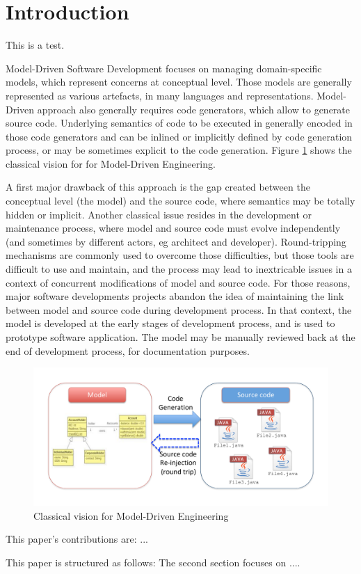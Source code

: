 \section{Introduction}

This is a test.

Model-Driven Software Development focuses on managing domain-specific models, which represent concerns at conceptual level. Those models are generally represented as various artefacts, in many languages and representations. Model-Driven approach also generally requires code generators, which allow to generate source code. Underlying semantics of code to be executed in generally encoded in those code generators and can be inlined or implicitly defined by code generation process, or may be sometimes explicit to the code generation. Figure \ref{fig:ClassicalVision} shows the classical vision for for Model-Driven Engineering.

A first major drawback of this approach is the gap created between the conceptual level (the model) and the source code, where semantics may be totally hidden or implicit. Another classical issue resides in the development or maintenance process, where model and source code must evolve independently (and sometimes by different actors, eg architect and developer). Round-tripping mechanisms are commonly used to overcome those difficulties, but those tools are difficult to use and maintain, and the process may lead to inextricable issues in a context of concurrent modifications of model  and source code. For those reasons, major software developments projects abandon the idea of maintaining the link between model and source code during development process. In that context, the model is developed at the early stages of development process, and is used to prototype software application. The model may be manually reviewed back at the end of development process, for documentation purposes.

\begin{figure}
    \centering
    \includegraphics[width=1.0 \columnwidth]{ClassicalVision.pdf}
    \caption{Classical vision for Model-Driven Engineering}
    \label{fig:ClassicalVision}
\end{figure}



This paper’s contributions are: ...


This paper is structured as follows: The second section focuses on .... 

